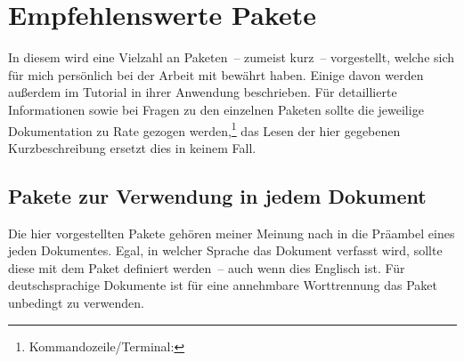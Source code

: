 \section{Empfehlenswerte Pakete}
\label{sec:packages:recommended}
In diesem \autorefname wird eine Vielzahl an Paketen~-- zumeist kurz~-- 
vorgestellt, welche sich für mich persönlich bei der Arbeit mit  
bewährt haben. Einige davon werden außerdem im Tutorial  in 
ihrer Anwendung beschrieben. Für detaillierte Informationen sowie bei Fragen zu 
den einzelnen Paketen sollte die jeweilige Dokumentation zu Rate gezogen
werden,\footnote{Kommandozeile/Terminal: }
das Lesen der hier gegebenen Kurzbeschreibung ersetzt dies in keinem Fall. 


\subsection{Pakete zur Verwendung in jedem Dokument}
Die hier vorgestellten Pakete gehören meiner Meinung nach in die Präambel eines 
jeden Dokumentes. Egal, in welcher Sprache das Dokument verfasst wird, sollte 
diese mit dem Paket  definiert werden~-- auch wenn dies 
Englisch ist. Für deutschsprachige Dokumente ist für eine annehmbare 
Worttrennung das Paket  unbedingt zu verwenden.

